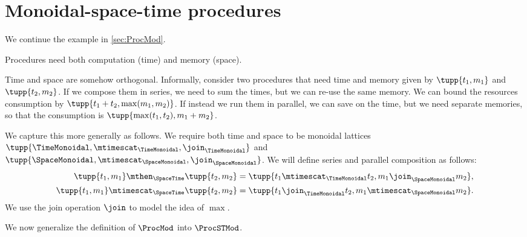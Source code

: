 
\section{Monoidal-space-time procedures}
\label{sub:monoidal-space-time}
We continue the example in \cref{sec:ProcMod}.

Procedures need both computation (time) and memory (space).

Time and space are somehow orthogonal.
%
Informally, consider two procedures that need time and memory given by $\tupp{t_1,m_1}$ and $\tupp{t_2, m_2}$.
If we compose them in series, we need to sum the times, but we can re-use the same memory.
We can bound the resources consumption  by $\tupp{t_1+t_2,\max(m_1, m_2)}$.
If instead we run them in parallel, we can save on the time, but we need separate memories, so that the consumption is $\tupp{\max(t_1,t_2), m_1 + m_2}$.

We capture this more generally as follows.
We require both time and space to be monoidal lattices $\tupp{\TimeMonoidal, \mtimescat_{\TimeMonoidal}, \join_{\TimeMonoidal}}$ and
$\tupp{\SpaceMonoidal, \mtimescat_{\SpaceMonoidal}, \join_{\SpaceMonoidal}}$.
%
We will define series and parallel composition as follows:
\begin{equation}
    \begin{aligned}
        \tupp{t_1,m_1} \mthen_{\SpaceTime}  \tupp{t_2,m_2}     & = \tupp{t_1 \mtimescat_{\TimeMonoidal} t_2, m_1 \join_{\SpaceMonoidal} m_2}, \\
        \tupp{t_1,m_1} \mtimescat_{\SpaceTime}  \tupp{t_2,m_2} & = \tupp{t_1 \join_{\TimeMonoidal} t_2, m_1 \mtimescat_{\SpaceMonoidal} m_2}.
    \end{aligned}
\end{equation}
We use the join operation $\join$ to model the idea of $\max$.

We now generalize the definition of $\ProcMod$ into $\ProcSTMod$.

